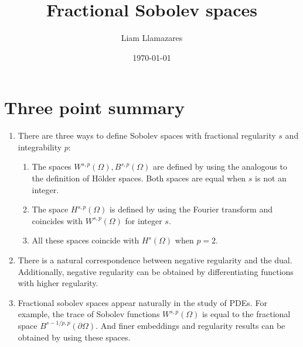 \documentclass[
    a4paper,
    DIV=14,
    abstract=true,
    numbers=noenddot
]
{scrartcl}
\theoremstyle{definition}
\begin{document}
\title{Fractional Sobolev spaces}
\author{Liam Llamazares}
\date{\today}
\maketitle
\section{Three point summary}
\begin{enumerate}
    \item There are three ways to define Sobolev spaces with fractional regularity $s$ and integrability $p$:
          \begin{enumerate}
              \item The spaces $W^{s,p}(\Omega ), B^{s,p}(\Omega )$  are defined by using the analogous to the definition of H\"older spaces. Both spaces are equal when  $s$ is not an integer.

              \item  The space $H^{s,p}(\Omega )$ is defined by using the Fourier transform and coincides with $W^{s,p}(\Omega )$ for integer $s$.
              \item All these spaces coincide with $H^s(\Omega )$  when $p=2$.
          \end{enumerate}
    \item There is a natural correspondence between negative regularity and the dual. Additionally, negative regularity can be obtained by differentiating functions with higher regularity.
    \item Fractional sobolev spaces appear naturally in the study of PDEs. For example, the trace of Sobolev functions $W^{s,p}(\Omega)$ is equal to the fractional space $B^{s-1/p,p}(\partial \Omega)$. And finer embeddings and regularity results can be obtained by using these spaces.
\end{enumerate}
\end{document}
